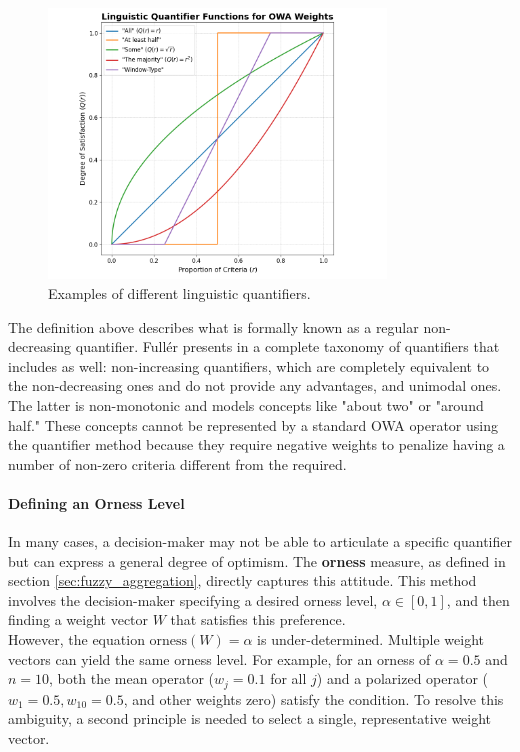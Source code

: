 \begin{figure}[!ht]
    \centering
    \includegraphics[width=0.8\textwidth]{ch2/figures/Quantifiers_examples.png}
    \caption{Examples of different linguistic quantifiers.}
    \label{fig:quantifier_examples}
\end{figure}
    

The definition above describes what is formally known as a regular non-decreasing quantifier. Fullér presents in \cite[ch.~2]{FULLER2} a complete taxonomy of quantifiers that includes as well: non-increasing quantifiers, which are completely equivalent to the non-decreasing ones and do not provide any advantages, and unimodal ones. The latter is non-monotonic and models concepts like "about two" or "around half." These concepts cannot be represented by a standard OWA operator using the quantifier method because they require negative weights to penalize having a number of non-zero criteria different from the required. 


\paragraph{Defining an Orness Level}

In many cases, a decision-maker may not be able to articulate a specific quantifier but can express a general degree of optimism. The \textbf{orness} measure, as defined in section \ref{sec:fuzzy_aggregation}, directly captures this attitude. This method involves the decision-maker specifying a desired orness level, $\alpha \in [0, 1]$, and then finding a weight vector $W$ that satisfies this preference.\\

However, the equation $\text{orness}(W) = \alpha$ is under-determined. Multiple weight vectors can yield the same orness level. For example, for an orness of $\alpha = 0.5$ and $n=10$, both the mean operator ($w_j = 0.1$ for all $j$) and a polarized operator ($w_1 = 0.5, w_{10} = 0.5$, and other weights zero) satisfy the condition. To resolve this ambiguity, a second principle is needed to select a single, representative weight vector.

